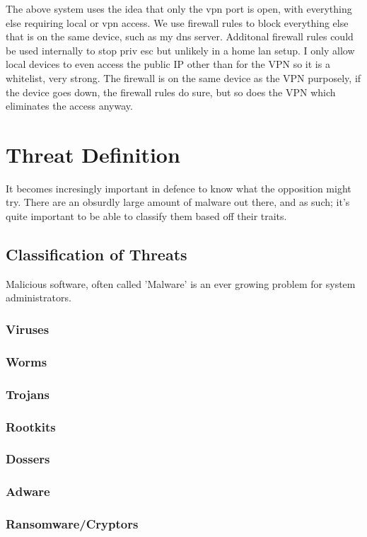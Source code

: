 The above system uses the idea that only the vpn port is open, with everything else requiring local or vpn access. We use firewall rules to block everything else that is on the same device, such as my dns server. Additonal firewall rules could be used internally to stop priv esc 
but unlikely in a home lan setup. I only allow local devices to even access the public IP other than for the VPN so it is a whitelist, very strong. The firewall is on the same device as the VPN purposely, if the device goes down, the firewall rules do sure, but so does the VPN which eliminates the access anyway.

\section{Threat Definition}
It becomes incresingly important in defence to know what the opposition might try. There are an obsurdly large amount of malware out there, and as such; it's quite important to be able to classify them based off their traits.

\subsection{Classification of Threats}
Malicious software, often called 'Malware' is an ever growing problem for system administrators. 

\subsubsection{Viruses}
\subsubsection{Worms}
\subsubsection{Trojans}
\subsubsection{Rootkits}
\subsubsection{Dossers}
\subsubsection{Adware}
\subsubsection{Ransomware/Cryptors}
